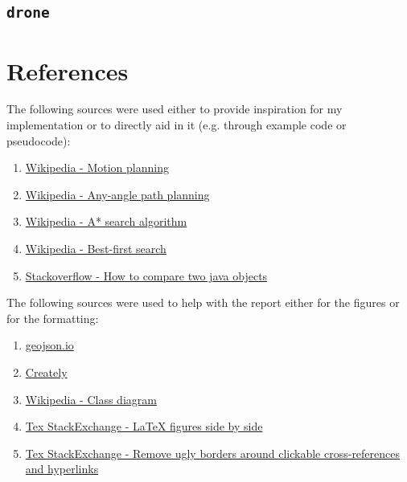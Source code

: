 \documentclass[11pt]{article}
\begin{document}
\subsection{\texttt{drone}}


\newpage
\section{References}
The following sources were used either to provide inspiration for my implementation or to directly aid in it (e.g. through example code or pseudocode):
\begin{enumerate}
    \item \href{https://en.wikipedia.org/wiki/Motion_planning#Grid-based_search}{Wikipedia - Motion planning}
    \item \href{https://en.wikipedia.org/wiki/Any-angle_path_planning}{Wikipedia - Any-angle path planning}
    \item \href{https://en.wikipedia.org/wiki/A*_search_algorithm#}{Wikipedia - A* search algorithm}
    \item \href{https://en.wikipedia.org/wiki/Best-first_search}{Wikipedia - Best-first search}
    \item \href{https://stackoverflow.com/questions/16069106/how-to-compare-two-java-objects}{Stackoverflow - How to compare two java objects}
\end{enumerate}

The following sources were used to help with the report either for the figures or for the formatting:
\begin{enumerate}
    \item \href{https://geojson.io}{geojson.io}
    \item \href{https://creately.com/}{Creately}
    \item \href{https://en.wikipedia.org/wiki/Class_diagram#Dependency}{Wikipedia - Class diagram}
    \item \href{https://tex.stackexchange.com/questions/37581/latex-figures-side-by-side#37597}{Tex StackExchange - LaTeX figures side by side}
    \item \href{https://tex.stackexchange.com/a/847}{Tex StackExchange - Remove ugly borders around clickable cross-references and hyperlinks}
\end{enumerate}
\end{document}
